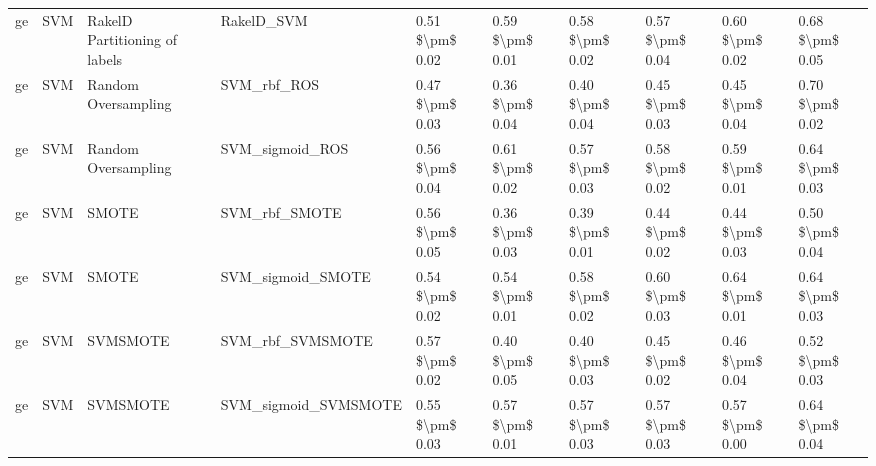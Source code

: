 \begin{tabular}{llllllllll}
      ge &                             SVM & RakelD Partitioning of labels &                                   RakelD\_SVM &     0.51 \$\textbackslash pm\$ 0.02 &           0.59 \$\textbackslash pm\$ 0.01 &       0.58 \$\textbackslash pm\$ 0.02 &        0.57 \$\textbackslash pm\$ 0.04 &                         0.60 \$\textbackslash pm\$ 0.02 & 0.68 \$\textbackslash pm\$ 0.05 \\
      ge &                             SVM &           Random Oversampling &                                  SVM\_rbf\_ROS &     0.47 \$\textbackslash pm\$ 0.03 &           0.36 \$\textbackslash pm\$ 0.04 &       0.40 \$\textbackslash pm\$ 0.04 &        0.45 \$\textbackslash pm\$ 0.03 &                         0.45 \$\textbackslash pm\$ 0.04 & 0.70 \$\textbackslash pm\$ 0.02 \\
      ge &                             SVM &           Random Oversampling &                              SVM\_sigmoid\_ROS &     0.56 \$\textbackslash pm\$ 0.04 &           0.61 \$\textbackslash pm\$ 0.02 &       0.57 \$\textbackslash pm\$ 0.03 &        0.58 \$\textbackslash pm\$ 0.02 &                         0.59 \$\textbackslash pm\$ 0.01 & 0.64 \$\textbackslash pm\$ 0.03 \\
      ge &                             SVM &                         SMOTE &                                SVM\_rbf\_SMOTE &     0.56 \$\textbackslash pm\$ 0.05 &           0.36 \$\textbackslash pm\$ 0.03 &       0.39 \$\textbackslash pm\$ 0.01 &        0.44 \$\textbackslash pm\$ 0.02 &                         0.44 \$\textbackslash pm\$ 0.03 & 0.50 \$\textbackslash pm\$ 0.04 \\
      ge &                             SVM &                         SMOTE &                            SVM\_sigmoid\_SMOTE &     0.54 \$\textbackslash pm\$ 0.02 &           0.54 \$\textbackslash pm\$ 0.01 &       0.58 \$\textbackslash pm\$ 0.02 &        0.60 \$\textbackslash pm\$ 0.03 &                         0.64 \$\textbackslash pm\$ 0.01 & 0.64 \$\textbackslash pm\$ 0.03 \\
      ge &                             SVM &                      SVMSMOTE &                             SVM\_rbf\_SVMSMOTE &     0.57 \$\textbackslash pm\$ 0.02 &           0.40 \$\textbackslash pm\$ 0.05 &       0.40 \$\textbackslash pm\$ 0.03 &        0.45 \$\textbackslash pm\$ 0.02 &                         0.46 \$\textbackslash pm\$ 0.04 & 0.52 \$\textbackslash pm\$ 0.03 \\
      ge &                             SVM &                      SVMSMOTE &                         SVM\_sigmoid\_SVMSMOTE &     0.55 \$\textbackslash pm\$ 0.03 &           0.57 \$\textbackslash pm\$ 0.01 &       0.57 \$\textbackslash pm\$ 0.03 &        0.57 \$\textbackslash pm\$ 0.03 &                         0.57 \$\textbackslash pm\$ 0.00 & 0.64 \$\textbackslash pm\$ 0.04 \\

\end{tabular}
